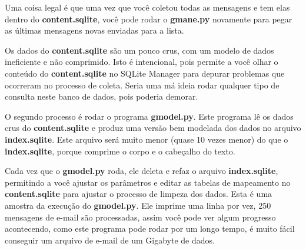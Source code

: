 Uma coisa legal é que uma vez que você coletou todas as mensagens e tem elas dentro do
{\bf content.sqlite}, você pode rodar o {\bf gmane.py} novamente para pegar as últimas 
mensagens novas enviadas para a lista.

Os dados do {\bf content.sqlite} são um pouco crus, com um modelo de dados ineficiente
e não comprimido.
Isto é intencional, pois permite a você olhar o conteúdo do {\bf content.sqlite}
no SQLite Manager para depurar problemas que ocorreram no processo de coleta.
Seria uma má ideia rodar qualquer tipo de consulta neste banco de dados, pois
poderia demorar.  

O segundo processo é rodar o programa {\bf gmodel.py}. Este programa lê os dados crus do
{\bf content.sqlite} e produz uma versão bem modelada dos dados no arquivo {\bf index.sqlite}.
Este arquivo será muito menor (quase 10 vezes menor) do que o {\bf index.sqlite}, porque 
comprime o corpo e o cabeçalho do texto.

Cada vez que o {\bf gmodel.py} roda, ele deleta e refaz o arquivo {\bf index.sqlite},
permitindo a você ajustar os parâmetros e editar as tabelas de mapeamento no {\bf content.sqlite}
para ajustar o processo de limpeza dos dados. Esta é uma amostra da execução do {\bf gmodel.py}.
Ele imprime uma linha por vez, 250 mensagens de e-mail são processadas, assim você pode ver
algum progresso acontecendo, como este programa pode rodar por um longo tempo, é muito
fácil conseguir um arquivo de e-mail de um Gigabyte de dados.

